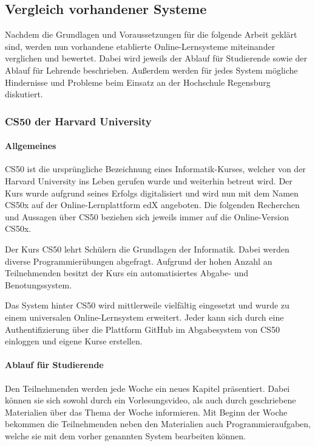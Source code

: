 \subsection{Vergleich vorhandener Systeme}
Nachdem die Grundlagen und Voraussetzungen für die folgende Arbeit geklärt sind,
werden nun vorhandene etablierte Online-Lernsysteme miteinander verglichen und
bewertet. Dabei wird jeweils der Ablauf für Studierende sowie der Ablauf für
Lehrende beschrieben. Außerdem werden für jedes System mögliche Hindernisse und
Probleme beim Einsatz an der Hochschule Regensburg diskutiert.

\subsubsection{CS50 der Harvard University}
\paragraph{Allgemeines}
CS50 ist die ursprüngliche Bezeichnung eines Informatik-Kurses, welcher von der
Harvard University ins Leben gerufen wurde und weiterhin betreut wird. Der Kurs
wurde aufgrund seines Erfolgs digitalisiert und wird nun mit dem Namen CS50x auf
der Online-Lernplattform edX angeboten. Die folgenden Recherchen und Aussagen
über CS50 beziehen sich jeweils immer auf die Online-Version CS50x.

Der Kurs CS50 lehrt Schülern die Grundlagen der Informatik. Dabei werden diverse
Programmierübungen abgefragt. Aufgrund der hohen Anzahl an Teilnehmenden besitzt
der Kurs ein automatisiertes Abgabe- und Benotungssystem.

Das System hinter CS50 wird mittlerweile vielfältig eingesetzt und wurde zu
einem universalen Online-Lernsystem erweitert. Jeder kann sich durch eine
Authentifizierung über die Plattform GitHub im Abgabesystem von CS50 einloggen
und eigene Kurse erstellen. \parencite{cs50}

\paragraph{Ablauf für Studierende}
Den Teilnehmenden werden jede Woche ein neues Kapitel präsentiert. Dabei können
sie sich sowohl durch ein Vorlesungsvideo, als auch durch geschriebene
Materialien über das Thema der Woche informieren. Mit Beginn der Woche bekommen
die Teilnehmenden neben den Materialien auch Programmieraufgaben, welche sie mit
dem vorher genannten System bearbeiten können. \parencite{cs50-edx}

